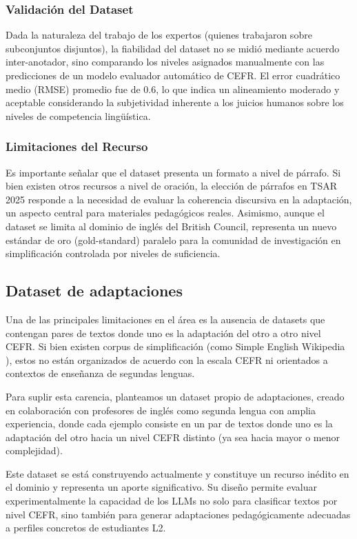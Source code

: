 \subsubsection*{Validación del Dataset}
Dada la naturaleza del trabajo de los expertos (quienes trabajaron sobre subconjuntos disjuntos), la fiabilidad del dataset no se midió mediante acuerdo inter-anotador, sino comparando los niveles asignados manualmente con las predicciones de un modelo evaluador automático de CEFR. El error cuadrático medio (RMSE) promedio fue de 0.6, lo que indica un alineamiento moderado y aceptable considerando la subjetividad inherente a los juicios humanos sobre los niveles de competencia lingüística.

\subsubsection*{Limitaciones del Recurso}
Es importante señalar que el dataset presenta un formato a nivel de párrafo. Si bien existen otros recursos a nivel de oración, la elección de párrafos en TSAR 2025 responde a la necesidad de evaluar la coherencia discursiva en la adaptación, un aspecto central para materiales pedagógicos reales. Asimismo, aunque el dataset se limita al dominio de inglés del British Council, representa un nuevo estándar de oro (gold-standard) paralelo para la comunidad de investigación en simplificación controlada por niveles de suficiencia.

\subsection{Dataset de adaptaciones}\label{subsection:dataset_adaptacion}
Una de las principales limitaciones en el área es la ausencia de datasets que contengan pares de textos donde uno es la adaptación del otro a otro nivel CEFR. Si bien existen corpus de simplificación (como Simple English Wikipedia \parencite{wikipedia}), estos no están organizados de acuerdo con la escala CEFR ni orientados a contextos de enseñanza de segundas lenguas.

Para suplir esta carencia, planteamos un dataset propio de adaptaciones, creado en colaboración con profesores de inglés como segunda lengua con amplia experiencia, donde cada ejemplo consiste en un par de textos donde uno es la adaptación del otro hacia un nivel CEFR distinto (ya sea hacia mayor o menor complejidad).

Este dataset se está construyendo actualmente y constituye un recurso inédito en el dominio y representa un aporte significativo. Su diseño permite evaluar experimentalmente la capacidad de los LLMs no solo para clasificar textos por nivel CEFR, sino también para generar adaptaciones pedagógicamente adecuadas a perfiles concretos de estudiantes L2.

